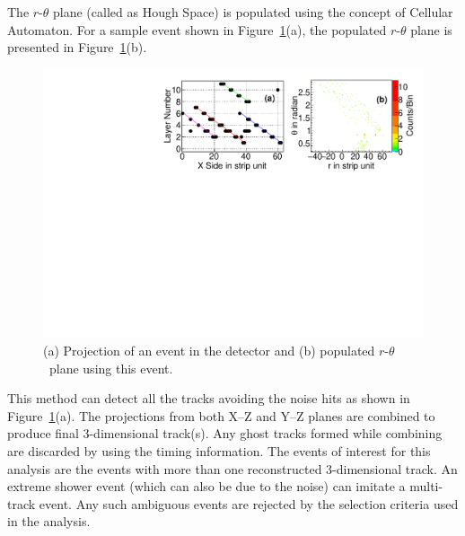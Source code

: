 \documentclass[a4paper,12pt,twoside]{article}
\begin{document}
The \mbox{$r$-$\theta$} plane (called as Hough Space) is populated using the concept of Cellular Automaton\cite{cellular}. For a sample event shown in Figure~\ref{fig:houghPl}(a), the populated \mbox{$r$-$\theta$} plane is presented in Figure~\ref{fig:houghPl}(b). 
\begin{figure}
  \centering
  \includegraphics[width=0.99\linewidth]{hough_Plane_new.pdf} 
  \caption{(a) Projection of an event in the detector and (b) populated $r$-$\theta$~plane using this event.}
  \label{fig:houghPl}
\end{figure}
This method can detect all the tracks avoiding the noise hits as shown in Figure~\ref{fig:houghPl}(a). The projections from both X--Z and Y--Z planes are combined to produce final 3-dimensional track(s). Any ghost tracks formed while combining are discarded by using the timing information. The events of interest for this analysis are the events with more than one reconstructed 3-dimensional track. An extreme shower event (which can also be due to the noise) can imitate a multi-track event. Any such ambiguous events are rejected by the selection criteria used in the analysis.
\end{document}
